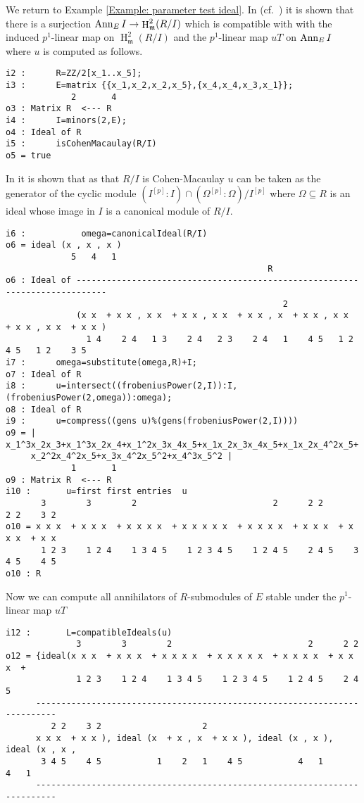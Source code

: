 \documentclass[11pt]{amsart}
\DeclareMathOperator{\HH}{H}
\begin{document}
\begin{example}

We return to Example \ref{Example: parameter test ideal}.
In (cf.~\cite[\S 9]{KatzmanParameterTestIdealOfCMRings}) it is shown that
there is a surjection $\Ann_E I \rightarrow \HH^2_{\mathfrak{m}} (R/I)$
which is compatible with with the induced $p^1$-linear map on $\HH^2_{\mathfrak{m}} (R/I)$
and the $p^1$-linear map $u T$ on $\operatorname{{Ann}}_E I$ where $u$ is computed as follows.
\begin{verbatim}
i2 :      R=ZZ/2[x_1..x_5];
i3 :      E=matrix {{x_1,x_2,x_2,x_5},{x_4,x_4,x_3,x_1}};
             2       4
o3 : Matrix R  <--- R
i4 :      I=minors(2,E);
o4 : Ideal of R
i5 :      isCohenMacaulay(R/I)
o5 = true
\end{verbatim}

In \cite{KatzmanParameterTestIdealOfCMRings} it is shown that as that $R/I$ is Cohen-Macaulay $u$
can be taken as the generator of the cyclic module $(I^{[p]}:I) \cap (\Omega^{[p]}:\Omega)/I^{[p]}$
where $\Omega \subseteq R$ is an ideal whose image in $I$ is a canonical module of $R/I$.


\begin{verbatim}
i6 :           omega=canonicalIdeal(R/I)
o6 = ideal (x , x , x )
             5   4   1
                                                    R
o6 : Ideal of ----------------------------------------------------------------------------
                                                       2
              (x x  + x x , x x  + x x , x x  + x x , x  + x x , x x  + x x , x x  + x x )
                1 4    2 4   1 3    2 4   2 3    2 4   1    4 5   1 2    4 5   1 2    3 5
i7 :      omega=substitute(omega,R)+I;
o7 : Ideal of R
i8 :      u=intersect((frobeniusPower(2,I)):I,(frobeniusPower(2,omega)):omega);
o8 : Ideal of R
i9 :      u=compress((gens u)%(gens(frobeniusPower(2,I))))
o9 = | x_1^3x_2x_3+x_1^3x_2x_4+x_1^2x_3x_4x_5+x_1x_2x_3x_4x_5+x_1x_2x_4^2x_5+
     x_2^2x_4^2x_5+x_3x_4^2x_5^2+x_4^3x_5^2 |
             1       1
o9 : Matrix R  <--- R
i10 :       u=first first entries  u
       3        3        2                           2      2 2        2 2    3 2
o10 = x x x  + x x x  + x x x x  + x x x x x  + x x x x  + x x x  + x x x  + x x
       1 2 3    1 2 4    1 3 4 5    1 2 3 4 5    1 2 4 5    2 4 5    3 4 5    4 5
o10 : R
\end{verbatim}
Now we can compute all annihilators of $R$-submodules of $E$ stable under the $p^1$-linear map $uT$
\begin{verbatim}
i12 :       L=compatibleIdeals(u)
              3        3        2                           2      2 2
o12 = {ideal(x x x  + x x x  + x x x x  + x x x x x  + x x x x  + x x x  +
              1 2 3    1 2 4    1 3 4 5    1 2 3 4 5    1 2 4 5    2 4 5
      --------------------------------------------------------------------------
         2 2    3 2                    2
      x x x  + x x ), ideal (x  + x , x  + x x ), ideal (x , x ), ideal (x , x ,
       3 4 5    4 5           1    2   1    4 5           4   1           4   1
      --------------------------------------------------------------------------


\end{verbatim}
\end{example}
\end{document}
